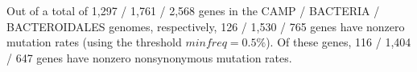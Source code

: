 Out of a total of 1,297 / 1,761 / 2,568 genes in the CAMP / BACTERIA / BACTEROIDALES genomes, respectively, 126 / 1,530 / 765 genes have nonzero mutation rates (using the threshold $minfreq=0.5\%$). Of these genes, 116 / 1,404 / 647 genes have nonzero nonsynonymous mutation rates.\endinput